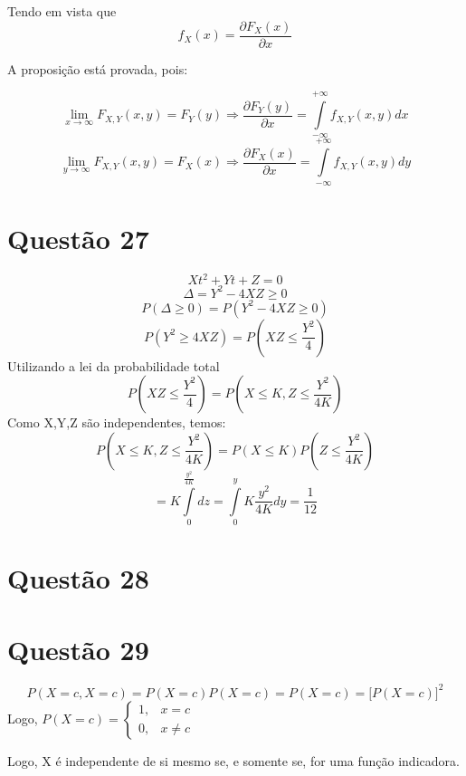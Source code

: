 \documentclass[a4paper,12pt]{report}
\begin{document}
		Tendo em vista que $$f_X(x) = \frac{\partial F_X(x)}{\partial x }  $$ 
		
		A proposição está provada, pois:
		
			$$ \lim\limits_{x\rightarrow \infty} F_{X,Y}(x,y)=F_Y(y)\Rightarrow \frac{\partial F_Y(y)}{\partial x } = \int\limits_{-\infty}^{+\infty} f_{X,Y}(x,y)dx $$
						$$ \lim\limits_{y\rightarrow \infty} F_{X,Y}(x,y)=F_X(x)\Rightarrow \frac{\partial F_X(x)}{\partial x }  = \int\limits_{-\infty}^{+\infty} f_{X,Y}(x,y)dy $$
						
						\newpage 
						
								\section*{Questão 27}
								
								$$Xt^2+Yt+Z = 0 $$
								$$\Delta  = Y^2-4XZ\ge 0 $$
								$$P(\Delta \ge 0 ) = P(Y^2 - 4XZ\ge 0 ) $$
								$$P(Y^2 \ge  4XZ) = P(XZ\le \frac{Y^2}{4}) $$
								Utilizando a lei da probabilidade total
								$$P(XZ\le \frac{Y^2}{4})=P(X\le K,Z\le \frac{Y^2}{4K}) $$
								Como X,Y,Z são independentes, temos:
								$$P(X\le K,Z\le \frac{Y^2}{4K}) = P(X\le K)P(Z\le\frac{Y^2}{4K} ) $$
								$$= K\int\limits_0^{\frac{y^2}{4K} } dz = \int\limits_0^y K \frac{y^2}{4K} dy= \frac{1}{12}$$
							\section*{Questão 28}
							\newpage 
														\section*{Questão 29}
														$$P(X=c,X=c)=P(X=c)P(X=c) = P(X=c)= \bigg[
														P(X=c)
														\bigg]^2 $$
														Logo, $P(X=c) =\begin{cases}
														1, & x=c\\
														0, & x\ne c
														\end{cases}$
														
														Logo, X é independente de si mesmo se, e somente se, for uma função indicadora.
														
\end{document}
